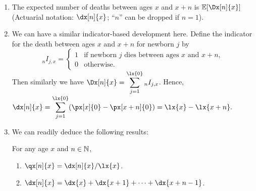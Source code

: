 \begin{enumerate}
\item The expected number of deaths between ages \(x\) and \(x+n\) is
\(\expv{\Dx[n]{x}}\) (Actuarial notation: \(\dx[n]{x}\); ``\(n\)'' can be
dropped if \(n=1\)).
\item We can have a similar indicator-based development here. Define the
indicator for the death between ages \(x\) and \(x+n\) for newborn \(j\) by
\[
{}_n I_{j,x}=
\begin{cases}
1&\text{if newborn \(j\) dies between ages \(x\) and \(x+n\)},\\
0&\text{otherwise}.
\end{cases}
\]
Then similarly we have
\(\displaystyle\Dx[n]{x}=\sum_{j=1}^{\lx{0}}{}_nI_{j,x}\). Hence,
\(\displaystyle\dx[n]{x}=\sum_{j=1}^{\lx{0}}(\px[x]{0}-\px[x+n]{0})=\lx{x}-\lx{x+n}.\)
\item We can readily deduce the following results:
\begin{proposition}
For any age \(x\) and \(n\in\mathbb{N}\),
\begin{enumerate}
\item \(\qx[n]{x}=\dx[n]{x}/\lx{x}\).
\item \(\dx[n]{x}=\dx{x}+\dx{x+1}+\dotsb+\dx{x+n-1}\).
\end{enumerate}
\end{proposition}
\end{enumerate}
